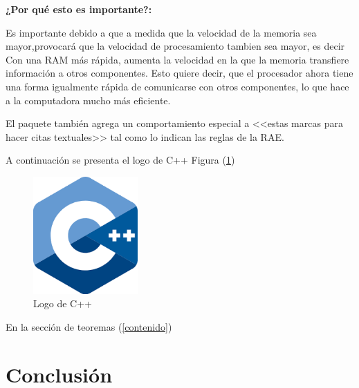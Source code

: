 \documentclass{article}
\begin{document}
\textbf{¿Por qué esto es importante?:}

Es importante debido a que a medida que la velocidad de la memoria sea mayor,provocará que la velocidad de procesamiento tambien sea mayor, es decir
Con una RAM más rápida, aumenta la velocidad en la que la memoria transfiere información a otros componentes. Esto quiere decir, que el procesador ahora tiene una forma igualmente rápida de comunicarse con otros componentes, lo que hace a la computadora mucho más eficiente.

El paquete también agrega un comportamiento especial 
a <<estas marcas para hacer citas textuales>> tal como 
lo indican las reglas de la RAE. \cite{dirac}
\cite{knuthwebsite}



A continuación se presenta el logo de C++ Figura (\ref{fig:cpplogo})

\begin{figure}[h]
\includegraphics[width=4cm]{cpplogo.png}
\centering
\caption{Logo de C++}
\label{fig:cpplogo}
\end{figure}

En la sección de teoremas (\ref{contenido})

\section{Conclusión} \label{conclulsion}





\end{document}
